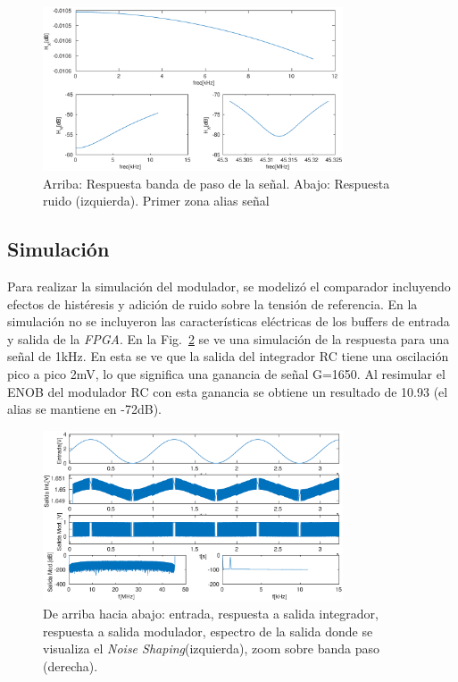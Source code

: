 \documentclass[a4paper,conference]{IEEEtran}
\begin{document}
\begin{figure}[!t]
\centering
\includegraphics[width=3.5in]{Respuesta_Modulador_Combinada}
\caption{Arriba: Respuesta banda de paso de la se\~nal. Abajo: Respuesta ruido (izquierda). Primer zona alias se\~nal}
\label{fig:Resp_mod}
\end{figure}

\subsection{Simulaci\'on}


Para realizar la simulación del modulador, se modelizó el comparador incluyendo efectos de histéresis y adición de ruido sobre la tensión de referencia. En la simulaci\'on no se incluyeron las caracter\'isticas el\'ectricas de los buffers de entrada y salida de la \textit{FPGA}. En la Fig.~\ref{fig:Sim_mod} se ve una simulaci\'on de la respuesta para una señal de 1kHz. En esta se ve que la salida del integrador RC tiene una oscilación pico a pico 2mV, lo que significa una ganancia de señal G=1650. Al resimular el ENOB del modulador RC con esta ganancia se obtiene un resultado de 10.93 (el alias se mantiene en -72dB).

\begin{figure}[!t]
\centering
\includegraphics[width=3.5in]{Simulacion_Modulador}
\caption{De arriba hacia abajo: entrada, respuesta a salida integrador, respuesta a salida modulador,  espectro de la salida donde se visualiza el \textit{Noise Shaping}(izquierda), zoom sobre banda paso (derecha).}
\label{fig:Sim_mod}
\end{figure}
\end{document}

